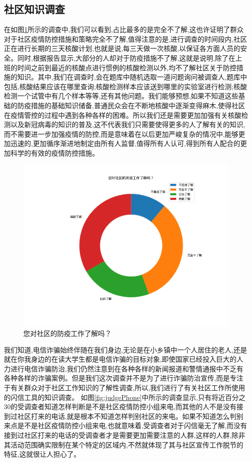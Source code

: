 \documentclass[AutoFakeBold]{LZUThesis}
\begin{document}
\subsection{社区知识调查}
在如图\ref{fig:knowledge}所示的调查中,我们可以看到,占比最多的是完全不了解,这也许证明了群众对于社区疫情防控措施和策略完全不了解,值得注意的是,进行调查的时间段内,社区正在进行长期的三天核酸计划,也就是说,每三天做一次核酸,以保证各方面人员的安全。同时,根据报告显示,大部分的人却对于防疫措施不了解,这就是说明,除了在上班的时间之前到最近的核酸点进行惯例的核酸检测以外,均不了解社区关于防控措施的知识。其中,我们在调查时,会在题库中随机选取一道问题询问被调查人,题库中包括,核酸结果应该在哪里查询;核酸检测样本应该送到哪里的实验室进行检测;核酸检测一个试管中有几个样本等等,还有其他问题。我们能够预想,如果不知道这些基础的防疫措施的基础知识储备,普通民众会在不断地核酸中逐渐变得麻木,使得社区在疫情管控的过程中遇到各种各样的困难。所以我们还是需要更加加强有关核酸检测以及新冠病毒的知识的普及,这不代表我们只需要使得更多的人了解有关的知识,而不需要进一步加强疫情的防控,而是意味着在以后更加严峻复杂的情况中,能够更加迅速的,更加循序渐进地制定由所有人监督,值得所有人认可,得到所有人配合的更加科学的有效的疫情防控措施。

\begin{figure}[!h]
	\centering
	\includegraphics[width=4 in]{figures/knowledge.png}
	\caption{您对社区的防疫工作了解吗？}
	\label{fig:knowledge}
\end{figure}

我们知道,电信诈骗始终伴随在我们身边,无论是在小乡镇中一个人居住的老人,还是就在你我身边的在读大学生都是电信诈骗的目标对象,即使国家已经投入巨大的人力进行电信诈骗防治,我们仍然注意到在各种各样的新闻报道和警情通报中不乏有各种各样的诈骗案例。但是我们这次调查并不是为了进行诈骗防治宣传,而是专注于有关群众对于社区工作知识的了解性调查,所以,我们进行了有关社区工作所使用的闪信工具的知识调查。
如图\ref{fig:judgePhone}中所示的调查显示,只有将近百分之30的受调查者知道怎样判断是不是社区疫情防控小组来电,而其他的人不是没有接到过社区打来的电话,就是根本不知道怎样判别社区的来电。如果不知道怎么判别来点是不是社区疫情防控小组来电,也就意味着,受调查者对于闪信毫无了解,而没有接到过社区打来的电话的受调查者才是需要更加需要注意的人群,这样的人群,除非其活动范围确实限制在某个特定的区域内,不然就体现了其与社区宣传工作脱节的特征,这就很让人担心了。
\end{document}
